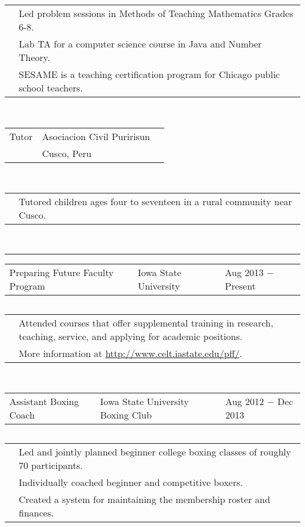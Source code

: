 \documentclass{article}
\newcommand{\q}{$\quad$ \newline}
\newcommand{\vl}{4.25}
\newcommand{\wl}{8.4}
\newcommand{\ww}{13}
\newcommand{\myrule}{\noindent \rule{\textwidth}{1pt}}
\begin{document}
\noindent \begin{tabular}{@{}p{\vl cm}p{\ww cm}@{}}
& Led problem sessions in Methods of Teaching Mathematics Grades 6-8. \\
& Lab TA for a computer science course in Java and Number Theory. \\
& SESAME is a teaching certification program for Chicago public school teachers.
\end{tabular} \q \q  

\noindent \begin{tabular}{@{}p{\vl cm}p{\wl cm}l@{}}
Tutor & Asociacion Civil Puririsun & \\
& Cusco, Peru
\end{tabular} \q \q

\noindent \begin{tabular}{@{}p{\vl cm}p{\ww cm}@{}}
& Tutored children ages four to seventeen in a rural community near Cusco.
\end{tabular} \q \q


\myrule


\noindent \begin{tabular}{@{}p{\vl cm}p{\wl cm}l@{}}
Preparing Future Faculty Program & Iowa State University & Aug 2013 $-$ Present
\end{tabular} \q 
 
\noindent \begin{tabular}{@{}p{\vl cm}p{\ww cm}@{}}
& Attended courses that offer supplemental training in research, teaching, service, and applying for academic positions. \\
& More information at \url{http://www.celt.iastate.edu/pff/}.
\end{tabular} \q \q
 
 
 
 
\noindent \begin{tabular}{@{}p{\vl cm}p{\wl cm}l@{}}
Assistant Boxing Coach & Iowa State University Boxing Club & Aug 2012 $-$ Dec 2013
\end{tabular} \q 
 
\noindent \begin{tabular}{@{}p{\vl cm}p{\ww cm}@{}}
& Led and jointly planned beginner college boxing classes of roughly 70 participants. \\
& Individually coached beginner and competitive boxers. \\
& Created a system for maintaining the membership roster and finances. \\
\end{tabular} \q \q
\end{document}
